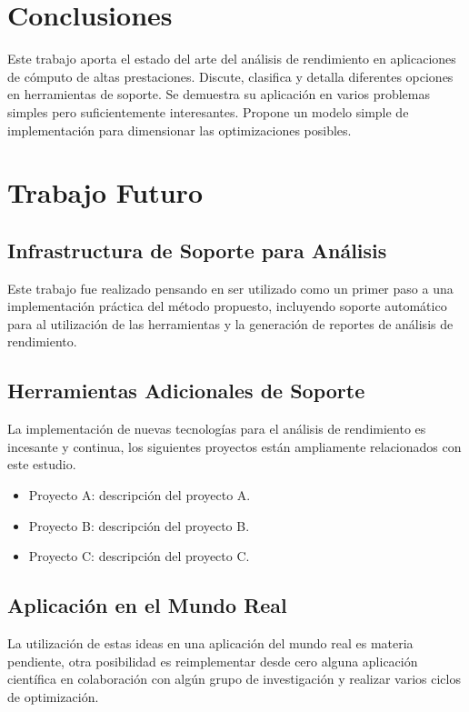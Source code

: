 \documentclass[a4paper]{report}
\begin{document}
\chapter{Conclusiones}

Este trabajo aporta el estado del arte del an\'alisis de rendimiento en
aplicaciones de c\'omputo de altas prestaciones. Discute, clasifica y detalla
diferentes opciones en herramientas de soporte. Se demuestra su aplicaci\'on
en varios problemas simples pero suficientemente interesantes. Propone un
modelo simple de implementaci\'on para dimensionar las optimizaciones posibles.

\chapter{Trabajo Futuro}

\section{Infrastructura de Soporte para An\'alisis}

Este trabajo fue realizado pensando en ser utilizado como un primer paso
a una implementaci\'on pr\'actica del m\'etodo propuesto, incluyendo soporte
autom\'atico para al utilizaci\'on de las herramientas y la generaci\'on de
reportes de an\'alisis de rendimiento.

\section{Herramientas Adicionales de Soporte}

La implementaci\'on de nuevas tecnolog\'ias para el an\'alisis de rendimiento
es incesante y continua, los siguientes proyectos est\'an ampliamente
relacionados con este estudio.

\begin{itemize}
\item Proyecto A: descripci\'on del proyecto A.
\item Proyecto B: descripci\'on del proyecto B.
\item Proyecto C: descripci\'on del proyecto C.
\end{itemize}

\section{Aplicaci\'on en el Mundo Real}

La utilizaci\'on de estas ideas en una aplicaci\'on del mundo real es materia
pendiente, otra posibilidad es reimplementar desde cero alguna aplicaci\'on
cient\'ifica en colaboraci\'on con alg\'un grupo de investigaci\'on y realizar
varios ciclos de optimizaci\'on.
\end{document}
